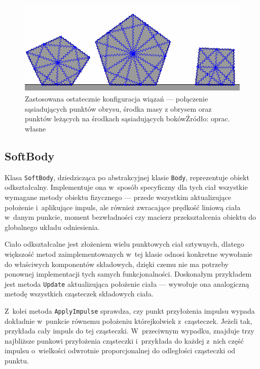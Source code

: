 \begin{figure}[h!]
	\centering
	\includegraphics[width=0.5\linewidth]{images/sprezyny}
	\caption[Zastosowana ostatecznie konfiguracja wiązań --- połączenie sąsiadujących punktów obrysu, środka masy z obrysem oraz punktów leżących na środkach sąsiadujących boków]{Zastosowana ostatecznie konfiguracja wiązań --- połączenie sąsiadujących punktów obrysu, środka masy z obrysem oraz punktów leżących na środkach sąsiadujących boków\newline Źródło: oprac. własne}
	\label{fig:sprezyny}
\end{figure}



\subsection{SoftBody}
Klasa \verb|SoftBody|, dziedzicząca po abstrakcyjnej klasie \verb|Body|, reprezentuje obiekt odkształcalny. Implementuje ona w~sposób specyficzny dla tych ciał wszystkie wymagane metody obiektu fizycznego --- przede wszystkim aktualizujące położenie i~aplikujące impuls, ale również zwracające prędkość liniową ciała w~danym punkcie, moment bezwładności czy macierz przekształcenia obiektu do globalnego układu odniesienia.

Ciało odkształcalne jest złożeniem wielu punktowych ciał sztywnych, dlatego większość metod zaimplementowanych w~tej klasie odnosi konkretne wywołanie do właściwych komponentów składowych, dzięki czemu nie ma potrzeby ponownej implementacji tych samych funkcjonalności. Doskonałym przykładem jest metoda \verb|Update| aktualizująca położenie ciała --- wywołuje ona analogiczną metodę wszystkich cząsteczek składowych ciała.

Z~kolei metoda \verb|ApplyImpulse| sprawdza, czy punkt przyłożenia impulsu wypada dokładnie w~punkcie równemu położeniu którejkolwiek z~cząsteczek. Jeżeli tak, przykłada cały impuls do tej cząsteczki. W~przeciwnym wypadku, znajduje trzy najbliższe punkowi przyłożenia cząsteczki i~przykłada do każdej z~nich część impulsu o~wielkości odwrotnie proporcjonalnej do odległości cząsteczki od punktu.

